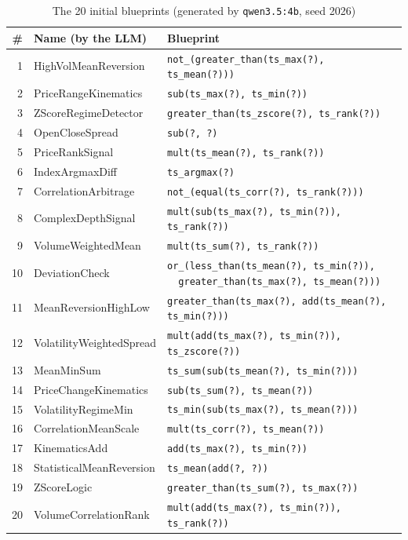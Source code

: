 \documentclass[12pt,a4paper,oneside]{book}
\theoremstyle{definition}
\newcommand{\code}[1]{\texttt{#1}}
\begin{document}
\begin{table}[H]
\centering
\caption{The 20 initial blueprints (generated by \code{qwen3.5:4b}, seed 2026)}
\label{tab:blueprints}
\footnotesize
\begin{tabular}{rll}
\toprule
\# & \textbf{Name (by the LLM)} & \textbf{Blueprint} \\
\midrule
1 & HighVolMeanReversion & \code{not\_(greater\_than(ts\_max(?), ts\_mean(?)))} \\
2 & PriceRangeKinematics & \code{sub(ts\_max(?), ts\_min(?))} \\
3 & ZScoreRegimeDetector & \code{greater\_than(ts\_zscore(?), ts\_rank(?))} \\
4 & OpenCloseSpread & \code{sub(?, ?)} \\
5 & PriceRankSignal & \code{mult(ts\_mean(?), ts\_rank(?))} \\
6 & IndexArgmaxDiff & \code{ts\_argmax(?)} \\
7 & CorrelationArbitrage & \code{not\_(equal(ts\_corr(?), ts\_rank(?)))} \\
8 & ComplexDepthSignal & \code{mult(sub(ts\_max(?), ts\_min(?)), ts\_rank(?))} \\
9 & VolumeWeightedMean & \code{mult(ts\_sum(?), ts\_rank(?))} \\
10 & DeviationCheck & \makecell[l]{\code{or\_(less\_than(ts\_mean(?), ts\_min(?)),}\\\code{\ \ greater\_than(ts\_max(?), ts\_mean(?)))}} \\
11 & MeanReversionHighLow & \code{greater\_than(ts\_max(?), add(ts\_mean(?), ts\_min(?)))} \\
12 & VolatilityWeightedSpread & \code{mult(add(ts\_max(?), ts\_min(?)), ts\_zscore(?))} \\
13 & MeanMinSum & \code{ts\_sum(sub(ts\_mean(?), ts\_min(?)))} \\
14 & PriceChangeKinematics & \code{sub(ts\_sum(?), ts\_mean(?))} \\
15 & VolatilityRegimeMin & \code{ts\_min(sub(ts\_max(?), ts\_mean(?)))} \\
16 & CorrelationMeanScale & \code{mult(ts\_corr(?), ts\_mean(?))} \\
17 & KinematicsAdd & \code{add(ts\_max(?), ts\_min(?))} \\
18 & StatisticalMeanReversion & \code{ts\_mean(add(?, ?))} \\
19 & ZScoreLogic & \code{greater\_than(ts\_sum(?), ts\_max(?))} \\
20 & VolumeCorrelationRank & \code{mult(add(ts\_max(?), ts\_min(?)), ts\_rank(?))} \\
\bottomrule
\end{tabular}
\end{table}
\end{document}
